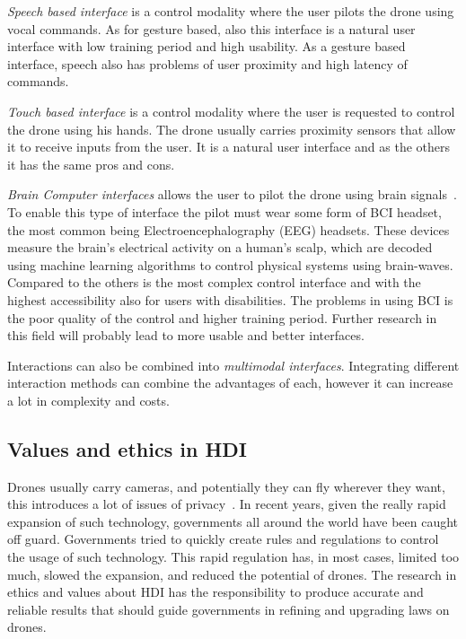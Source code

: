 \textit{Speech based interface} is a control modality where the user pilots the drone using vocal commands. 
As for gesture based, also this interface is a natural user interface with low training period and high usability. 
As a gesture based interface, speech also has problems of user proximity and high latency of commands.  

\textit{Touch based interface} is a control modality where the user is requested to control the drone using his hands. 
The drone usually carries proximity sensors that allow it to receive inputs from the user. 
It is a natural user interface and as the others it has the same pros and cons.

\textit{Brain Computer interfaces} allows the user to pilot the drone using brain signals~\cite{lafleur2013quadcopterBCI}.
To enable this type of interface the pilot must wear some form of BCI headset, the most common being 
Electroencephalography (EEG) headsets. These devices measure the brain's electrical activity on a human's scalp, 
which are decoded using machine learning algorithms to control physical systems using brain-waves. 
Compared to the others is the most complex control interface and with the highest accessibility also for users with disabilities. 
The problems in using BCI is the poor quality of the control and higher training period. 
Further research in this field will probably lead to more usable and better interfaces.

Interactions can also be combined into \textit{multimodal interfaces}. 
Integrating different interaction methods can combine the advantages of each, however it can increase a lot in complexity and costs.

\subsection{Values and ethics in HDI}\label{subsec:hdi_ethics}
Drones usually carry cameras, and potentially they can fly wherever they want, this introduces a lot of issues of privacy~\cite{anderson2012accidentally}.
In recent years, given the really rapid expansion of such technology, governments all around the world have been caught off guard. 
Governments tried to quickly create rules and regulations to control the usage of such technology. 
This rapid regulation has, in most cases, limited too much, slowed the expansion, and reduced the potential of drones.
The research in ethics and values about HDI has the responsibility to produce accurate and reliable results that should guide 
governments in refining and upgrading laws on drones.


